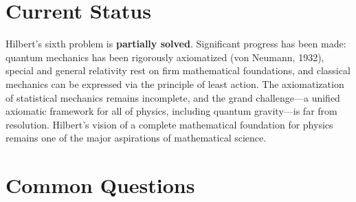 \section{Current Status}

\begin{partiallybox}
Hilbert's sixth problem is \textbf{partially solved}. Significant progress has been made: quantum mechanics has been rigorously axiomatized (von Neumann, 1932), special and general relativity rest on firm mathematical foundations, and classical mechanics can be expressed via the principle of least action. The axiomatization of statistical mechanics remains incomplete, and the grand challenge---a unified axiomatic framework for all of physics, including quantum gravity---is far from resolution. Hilbert's vision of a complete mathematical foundation for physics remains one of the major aspirations of mathematical science.
\end{partiallybox}

\section*{Common Questions}

